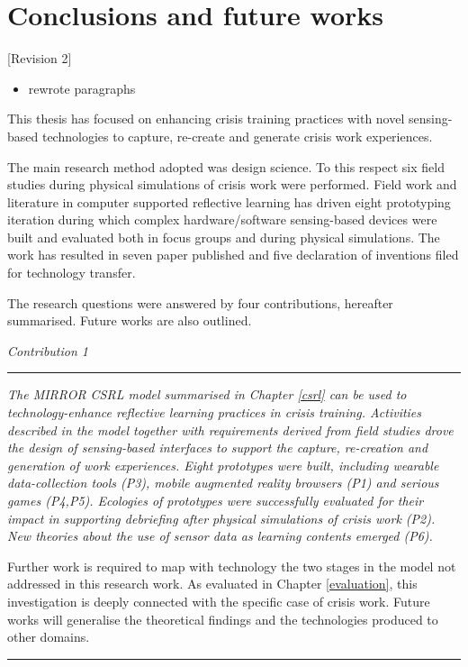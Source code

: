 \chapter{Conclusions and future works}\label{conclusions}

{[}Revision 2{]}

\begin{itemize}
\itemsep1pt\parskip0pt
\item
  rewrote paragraphs
\end{itemize}

This thesis has focused on enhancing crisis training practices with
novel sensing-based technologies to capture, re-create and generate
crisis work experiences.

The main research method adopted was design science. To this respect six
field studies during physical simulations of crisis work were performed.
Field work and literature in computer supported reflective learning has
driven eight prototyping iteration during which complex
hardware/software sensing-based devices were built and evaluated both in
focus groups and during physical simulations. The work has resulted in
seven paper published and five declaration of inventions filed for
technology transfer.

The research questions were answered by four contributions, hereafter
summarised. Future works are also outlined. \bigskip

\emph{Contribution 1} \newline
\rule{\textwidth}{.1pt} \emph{The MIRROR CSRL model summarised in
Chapter \ref{csrl} can be used to technology-enhance reflective learning
practices in crisis training. Activities described in the model together
with requirements derived from field studies drove the design of
sensing-based interfaces to support the capture, re-creation and
generation of work experiences. Eight prototypes were built, including
wearable data-collection tools (P3), mobile augmented reality browsers
(P1) and serious games (P4,P5). Ecologies of prototypes were
successfully evaluated for their impact in supporting debriefing after
physical simulations of crisis work (P2). New theories about the use of
sensor data as learning contents emerged (P6).}

Further work is required to map with technology the two stages in the
model not addressed in this research work. As evaluated in Chapter
\ref{evaluation}, this investigation is deeply connected with the
specific case of crisis work. Future works will generalise the
theoretical findings and the technologies produced to other domains.
\rule{\textwidth}{.1pt} \medskip

